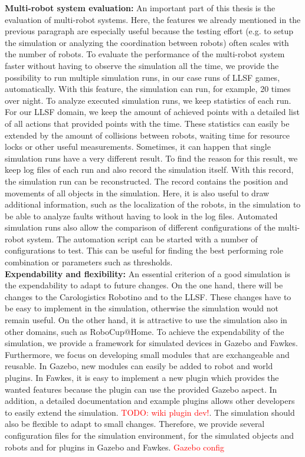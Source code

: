 \textbf{Multi-robot system evaluation:} An important part of this thesis is the evaluation of multi-robot systems. Here, the features we already mentioned in the previous paragraph are especially useful because the testing effort (e.g. to setup the simulation or analyzing the coordination between robots) often scales with the number of robots. To evaluate the performance of the multi-robot system faster without having to observe the simulation all the time, we provide the possibility to run multiple simulation runs, in our case runs of LLSF games, automatically. With this feature, the simulation can run, for example, 20 times over night. To analyze executed simulation runs, we keep statistics of each run. For our LLSF domain, we keep the amount of achieved points with a detailed list of all actions that provided points with the time. These statistics can easily be extended by the amount of collisions between robots, waiting time for resource locks or other useful measurements. Sometimes, it can happen that single simulation runs have a very different result. To find the reason for this result, we keep log files of each run and also record the simulation itself. With this record, the simulation run can be reconstructed. The record contains the position and movements of all objects in the simulation. Here, it is also useful to draw additional information, such as the localization of the robots, in the simulation to be able to analyze faults without having to look in the log files. Automated simulation runs also allow the comparison of different configurations of the multi-robot system. The automation script can be started with a number of configurations to test. This can be useful for finding the best performing role combination or parameters such as thresholds.\\
\textbf{Expendability and flexibility:} An essential criterion of a good simulation is the expendability to adapt to future changes. On the one hand, there will be changes to the Carologistics Robotino and to the LLSF. These changes have to be easy to implement in the simulation, otherwise the simulation would not remain useful. On the other hand, it is attractive to use the simulation also in other domains, such as RoboCup@Home. To achieve the expendability of the simulation, we provide a framework for simulated devices in Gazebo and Fawkes. Furthermore, we focus on developing small modules that are exchangeable and reusable. In Gazebo, new modules can easily be added to robot and world plugins. In Fawkes, it is easy to implement a new plugin which provides the wanted features because the plugin can use the provided Gazebo aspect. In addition, a detailed documentation and example plugins allows other developers to easily extend the simulation. \textcolor{red}{TODO: wiki plugin dev!}. The simulation should also be flexible to adapt to small changes. Therefore, we provide several configuration files for the simulation environment, for the simulated objects and robots and for plugins in Gazebo and Fawkes. \textcolor{red}{Gazebo config}\\

